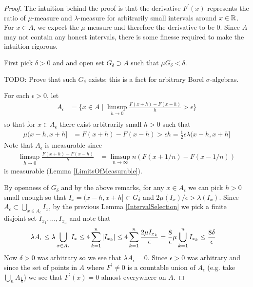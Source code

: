 \documentclass{amsart}
\theoremstyle{remark}
\theoremstyle{definition}
\begin{document}
\begin{proof}The intuition behind the proof is that the derivative
  $F^\prime(x)$ represents the ratio of $\mu$-measure and
  $\lambda$-measure for arbitrarily small intervals around $x \in
  \mathbb{R}$.  For $x \in A$, we expect the $\mu$-measure and therefore
  the derivative to be $0$.  Since $A$ may not contain any honest
  intervals, there is some finesse required to make the intuition rigorous.

First pick $\delta > 0$ and and open set $G_\delta \supset A$ such that $\mu
G_\delta < \delta$.  

TODO: Prove that such $G_\delta$ exists; this is a fact for arbitrary
Borel $\sigma$-algebras.

For each $\epsilon > 0$, let 
\begin{align*}
A_\epsilon &= \{ x \in A \mid \limsup_{h \to 0} \frac{F(x + h) - F(x -
  h)}{h} > \epsilon \} \\
\end{align*}
so that for $x \in A_\epsilon$ there exist arbitrarily small $h > 0$
such that 
\begin{align*}
\mu(x-h,x+h] &=F(x + h) - F(x -  h) > \epsilon h =
\frac{1}{2}\epsilon \lambda(x-h,x+h]
\end{align*}
Note that $A_\epsilon$ is measurable since 
\begin{align*}
\limsup_{h \to 0}  \frac{F(x + h) - F(x -
  h)}{h} &= \limsup_{n \to \infty} n \left(F(x + 1/n) - F(x -
  1/n)\right)
\end{align*} 
is measurable (Lemma \ref{LimitsOfMeasurable}).

By openness of $G_\delta$ and by the above remarks, for any $x \in A_\epsilon$ we can pick $h > 0$ small enough so that
$I_x = (x - h, x+h] \subset G_\delta$ and $2\mu(I_x)/\epsilon > \lambda(I_x)$.  Since $A_\epsilon \subset
\bigcup_{x \in A_\epsilon} I_x$, by the previous Lemma
\ref{IntervalSelection} we pick a finite disjoint set $I_{x_1}, \dots,
I_{x_n}$ and note that
\begin{align*}
\lambda A_\epsilon &\leq \lambda 
\bigcup_{x \in A_\epsilon} I_x \leq 4 \sum_{k=1}^n \left \vert I_{x_k} \right \vert \leq
4 \sum_{k=1}^n \frac{2\mu I_{x_k}}{ \epsilon} = \frac{8}{\epsilon} \mu
\bigcup_{k=1}^n I_{x_k} \leq \frac{8\delta}{\epsilon}
\end{align*}
Now $\delta > 0$ was arbitrary so we see that $\lambda A_\epsilon =
0$.  Since $\epsilon > 0$ was arbitrary and since the set of points in
$A$ where $F^\prime \neq
0$ is a countable union of $A_\epsilon$ (e.g. take $\bigcup_n
A_{\frac{1}{n}}$)  we see that $F^\prime(x) = 0$
almost everywhere on $A$.
\end{proof}
\end{document}
